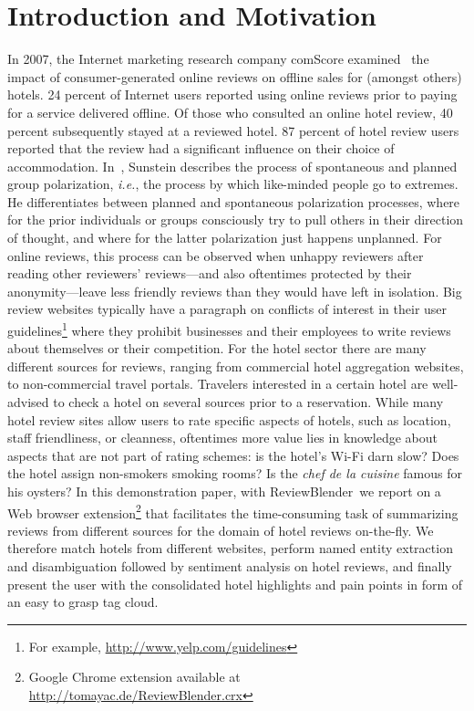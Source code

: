 \documentclass[runningheads,a4paper]{llncs}
\begin{document}
\section{Introduction and Motivation}
In 2007, the Internet marketing research company comScore examined~\cite{comscore2007} the impact of consumer-generated online reviews on offline sales for (amongst others) hotels. 24 percent of Internet users reported using online reviews prior to paying for a service delivered offline. Of those who consulted an online hotel review, 40 percent subsequently stayed at a reviewed hotel. 87 percent of hotel review users reported that the review had a significant influence on their choice of accommodation. In~\cite{chicagolaw2005}, Sunstein describes the process of spontaneous and planned group polarization, \emph{i.e.}, the process by which like-minded people go to extremes. He differentiates between planned and spontaneous polarization processes, where for the prior individuals or groups consciously try to pull others in their direction of thought, and where for the latter polarization just happens unplanned. For online reviews, this process can be observed when unhappy reviewers after reading other reviewers' reviews---and also oftentimes protected by their anonymity---leave less friendly reviews than they would have left in isolation. Big review websites typically have a paragraph on conflicts of interest in their user guidelines\footnote{For example, \url{http://www.yelp.com/guidelines}} where they prohibit businesses and their employees to write reviews about themselves or their competition. For the hotel sector there are many different sources for reviews, ranging from commercial hotel aggregation websites, to non-commercial travel portals. Travelers interested in a certain hotel are well-advised to check a hotel on several sources prior to a reservation. While many hotel review sites allow users to rate specific aspects of hotels, such as location, staff friendliness, or cleanness, oftentimes more value lies in knowledge about aspects that are not part of rating schemes: is the hotel's Wi-Fi darn slow? Does the hotel assign non-smokers smoking rooms? Is the \emph{chef de la cuisine} famous for his oysters? In this demonstration paper, with ReviewBlender\texttrademark \  we report on a Web browser extension\footnote{Google Chrome extension available at \url{http://tomayac.de/ReviewBlender.crx}} that facilitates the time-consuming task of summarizing reviews from different sources for the domain of hotel reviews on-the-fly. We therefore match hotels from different websites, perform named entity extraction and disambiguation followed by sentiment analysis on hotel reviews, and finally present the user with the consolidated hotel highlights and pain points in form of an easy to grasp tag cloud.
\end{document}
